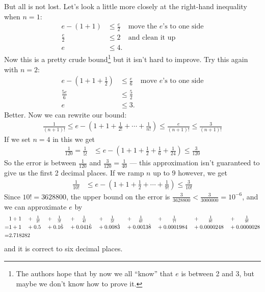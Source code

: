 \begin{eg}
But all is not lost. Let's look a little more closely at the right-hand inequality when $n=1$:
\begin{align*}
  e - (1+1) &\leq \frac{e}{2}& \text{move the $e$'s to one side}\\
  \frac{e}{2} & \leq 2 & \text{and clean it up}\\
  e & \leq 4.
\end{align*}
Now this is a pretty crude bound\footnote{The authors hope that by now we all ``know'' that $e$ is between 2 and 3,
but maybe we don't know how to prove it.} but it isn't hard to improve. Try this again with $n=2$:
\begin{align*}
  e - (1+1+\frac{1}{2}) & \leq \frac{e}{6} & \text{move $e$'s to one side}\\
  \frac{5e}{6} & \leq \frac{5}{2} \\
  e & \leq 3.
\end{align*}
Better. Now we can rewrite our bound:
\begin{align*}
\frac{1}{(n+1)!} \leq e - \left( 1+1+\tfrac{1}{2!}+\cdots+\tfrac{1}{n!} \right) \leq \frac{e}{(n+1)!} \leq
\frac{3}{(n+1)!}
\end{align*}
If we set $n=4$ in this we get
\begin{align*}
\frac{1}{120}=\frac{1}{5!} &\leq e - \left(1 + 1 + \frac{1}{2} + \frac{1}{6} + \frac{1}{24} \right) \leq \frac{3}{120}
\end{align*}
So the error is between $\frac{1}{120}$ and $\frac{3}{120}=\frac{1}{40}$ ---  this approximation isn't guaranteed
to give us the first 2 decimal places. If we ramp $n$ up to $9$ however, we get
\begin{align*}
\frac{1}{10!} &\leq e - \left(1 + 1 + \frac{1}{2} + \cdots + \frac{1}{9!} \right) \leq \frac{3}{10!}
\end{align*}
Since $10! = 3628800$, the upper bound on the error is $\frac{3}{3628800} < \frac{3}{3000000} = 10^{-6}$, and we
can approximate $e$ by
\begin{alignat*}{10}
&1+1 &
  &+\ \tfrac{1}{2!} &
  &+\ \ \tfrac{1}{3!}\ &
  &+\hskip10pt\tfrac{1}{4!}\hskip10pt &
  &+\hskip10pt\tfrac{1}{5!}\hskip10pt &
  &+\hskip10pt\tfrac{1}{6!}\hskip10pt &
  &+\hskip15pt\tfrac{1}{7!}\hskip15pt &
  &+\hskip15pt\tfrac{1}{8!}\hskip15pt &
  &+\hskip15pt\tfrac{1}{9!}
\\
 =&1+1&
 &+0.5&
 &+0.1\dot 6&
 &+0.041\dot 6&
 &+0.008\dot 3&
 &+0.0013\dot 8&
 &+0.0001984&
 &+0.0000248&
 &+0.0000028\\
=&2.718282\hidewidth
\end{alignat*}
and it is correct to six decimal places.
\end{eg}



